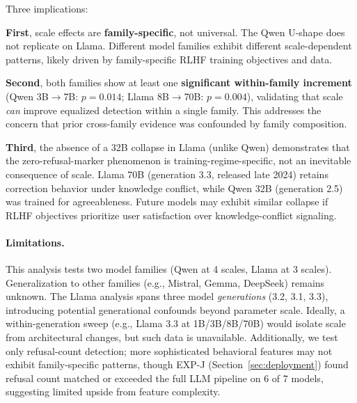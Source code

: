 Three implications:

\textbf{First}, scale effects are \textbf{family-specific}, not universal. The Qwen U-shape does not replicate on Llama. Different model families exhibit different scale-dependent patterns, likely driven by family-specific RLHF training objectives and data.

\textbf{Second}, both families show at least one \textbf{significant within-family increment} (Qwen 3B$\to$7B: $p=0.014$; Llama 8B$\to$70B: $p=0.004$), validating that scale \emph{can} improve equalized detection within a single family. This addresses the concern that prior cross-family evidence was confounded by family composition.

\textbf{Third}, the absence of a 32B collapse in Llama (unlike Qwen) demonstrates that the zero-refusal-marker phenomenon is training-regime-specific, not an inevitable consequence of scale. Llama 70B (generation 3.3, released late 2024) retains correction behavior under knowledge conflict, while Qwen 32B (generation 2.5) was trained for agreeableness. Future models may exhibit similar collapse if RLHF objectives prioritize user satisfaction over knowledge-conflict signaling.

\paragraph{Limitations.}
This analysis tests two model families (Qwen at 4 scales, Llama at 3 scales). Generalization to other families (e.g., Mistral, Gemma, DeepSeek) remains unknown. The Llama analysis spans three model \emph{generations} (3.2, 3.1, 3.3), introducing potential generational confounds beyond parameter scale. Ideally, a within-generation sweep (e.g., Llama 3.3 at 1B/3B/8B/70B) would isolate scale from architectural changes, but such data is unavailable. Additionally, we test only refusal-count detection; more sophisticated behavioral features may not exhibit family-specific patterns, though EXP-J (Section~\ref{sec:deployment}) found refusal count matched or exceeded the full LLM pipeline on 6 of 7 models, suggesting limited upside from feature complexity.
